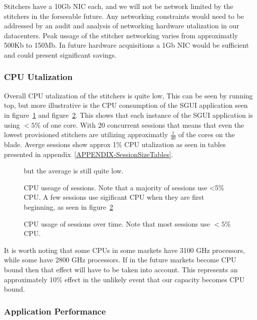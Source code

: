 \documentclass{article}
\begin{document}
Stitchers have a 10Gb NIC each, and we will not be network limited by the stitchers in the forseeable future. Any networking constraints would need to be addressed by an audit and analysis of networking hardware utalization in our datacenters. Peak ussage of the stitcher networking varies from approximatly 500Kb to 150Mb. In future hardware acquisitions a 1Gb NIC would be sufficient and could present significant savings. 

\subsubsection{CPU Utalization}
\label{SECTION-CPUUse}

Overall CPU utalization of the stitchers is quite low, This can be seen by running top, but more illustrative is the CPU consumption of the SGUI application seen in figure~\ref{FIGURE-CPUuse} and figure~\ref{FIGURE-CPUvsTime}. This shows that each instance of the SGUI application is using $<5\%$ of one core. With 20 concurrent sessions that means that even the lowest provisioned stitchers are utilizing approximatly $\frac{1}{40}$ of the cores on the blade. Averge sessions show approx 1\% CPU utalization as seen in tables presented in appendix~\ref{APPENDIX-SessionSizeTables}.

\begin{figure}[!htb]
        \caption{\label{FIGURE-CPUuse} CPU useage of sessions. Note that a majority of sessions use <5\% CPU.  A few sessions use sigificant CPU when they are first beginning, as seen in figure~\ref{FIGURE-CPUvsTime}} but the average is still quite low. 
\end{figure}

\begin{figure}[!htb]
        \caption{\label{FIGURE-CPUvsTime} CPU usage of sessions over time. Note that most sessions use $<5$\% CPU.}
\end{figure}

It is worth noting that some CPUs in some markets have 3100 GHz processors, while some have 2800 GHz processors. If in the future markets become CPU bound then that effect will have to be taken into account. This represents an approximately 10\% effect in the unlikely event that our capacity becomes CPU bound. 

\subsubsection{Application Performance}
\label{SECTION-APPPerf}
\end{document}
